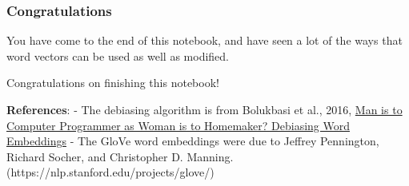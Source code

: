 \documentclass[11pt]{article}
\begin{document}
    \subsubsection{Congratulations}\label{congratulations}

You have come to the end of this notebook, and have seen a lot of the
ways that word vectors can be used as well as modified.

Congratulations on finishing this notebook!

    \textbf{References}: - The debiasing algorithm is from Bolukbasi et al.,
2016,
\href{https://papers.nips.cc/paper/6228-man-is-to-computer-programmer-as-woman-is-to-homemaker-debiasing-word-embeddings.pdf}{Man
is to Computer Programmer as Woman is to Homemaker? Debiasing Word
Embeddings} - The GloVe word embeddings were due to Jeffrey Pennington,
Richard Socher, and Christopher D. Manning.
(https://nlp.stanford.edu/projects/glove/)


    
    
    
    
\end{document}
